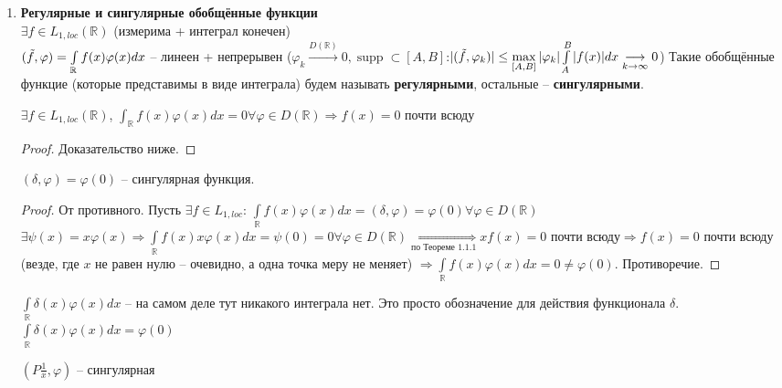 \begin{enumerate}
\begin{example}
        \end{example}
    \item \textbf{Регулярные и сингулярные обобщённые функции}\\
    $\exists f \in L_{1, loc} (\mathbb{R})$ (измерима + интеграл конечен)\\
    $(\Tilde{f}, \varphi) = \int\limits_{\mathbb{R}} f(x) \varphi(x) dx$ -- линеен + непрерывен ($ \varphi_k \overset{D(\mathbb{R})} {\longrightarrow} 0, \operatorname{supp} \subset[A, B]$:$|(\Tilde{f}, \varphi_k)| \leq \max\limits_{[A, B]} |\varphi_k| \int\limits_A^B |f(x)|dx \underset{k \to \infty}{\longrightarrow}0$)
    Такие обобщённые функцие (которые представимы в виде интеграла) будем называть \textbf{регулярными}, остальные -- \textbf{сингулярными}.
    \begin{theorem}
        $\exists f \in L_{1, loc} (\mathbb{R})$, $\int_{\mathbb{R}} f(x) \varphi(x) d x = 0 \forall \varphi \in D(\mathbb{R}) \Rightarrow f(x) = 0$ почти всюду
        \begin{proof}
            Доказательство ниже.
        \end{proof}
    \end{theorem}
    \begin{example}
         $(\delta, \varphi) = \varphi(0)$ -- сингулярная функция.
         \begin{proof}
            От противного. Пусть $\exists f \in L_{1, loc}$: $\int\limits_{\mathbb{R}} f(x) \varphi(x) d x = (\delta, \varphi) = \varphi(0) \forall \varphi \in D(\mathbb{R})$ \\
            $\exists \psi (x) = x \varphi (x) \Rightarrow \int\limits_{\mathbb{R}} f(x) x \varphi(x) d x = \psi (0) = 0 \forall \varphi \in D(\mathbb{R}) \underset{\text{по Теореме 1.1.1}}{\Rightarrow} x f(x) = 0 \text{ почти всюду} \Rightarrow f(x) = 0 \text{ почти всюду}$ (везде, где $x$ не равен нулю -- очевидно, а одна точка меру не меняет) $\Rightarrow \int\limits_{\mathbb{R}} f(x) \varphi(x) d x = 0 \neq \varphi (0)$. Противоречие.
         \end{proof}
    \end{example}
    \begin{warning}
        $\int\limits_{\mathbb{R}} \delta(x) \varphi(x) d x$ -- на самом деле тут никакого интеграла нет. Это просто обозначение для действия функционала $\delta$. $\int\limits_{\mathbb{R}} \delta(x) \varphi(x) d x = \varphi (0)$
    \end{warning}
    \begin{example}
        $(P\frac{1}{x}, \varphi)$ -- сингулярная

\end{example}
\end{enumerate}
